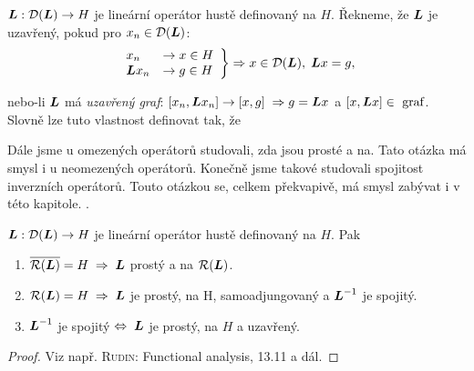 \begin{definition}
$\boldsymbol{L} : \mathcal{D}(\boldsymbol{L}) \to H$ je lineární operátor hustě definovaný na $H$.  Řekneme, že $\boldsymbol{L}$ je uzavřený, pokud pro $x_n\in\mathcal{D}(\boldsymbol{L})$:
 \begin{equation*}
    \begin{split}
        \left.
    \begin{array}{ll}
        x_n&\rightarrow x\in H\\
        \boldsymbol{L}x_n&\rightarrow g \in H
    \end{array}
        \right \} \Rightarrow x\in \mathcal{D}(\boldsymbol{L}),\; \boldsymbol{L}x=g,
    \end{split}
\end{equation*}
\end{definition}
nebo-li $\boldsymbol{L}$ má \emph{uzavřený graf}: $[x_n,\boldsymbol{L}x_n]\rightarrow [x,g]\;\Rightarrow g=\boldsymbol{L} x$ a $[x,\boldsymbol{L}x]\in \text{ graf}$. Slovně lze tuto vlastnost definovat tak, že 

Dále jsme u omezených operátorů studovali, zda jsou prosté a na. Tato otázka má smysl i u neomezených operátorů. Konečně jsme takové studovali spojitost inverzních operátorů. Touto otázkou se, celkem překvapivě, má smysl zabývat i v této kapitole.  .

\begin{theorem}
$\boldsymbol{L} : \mathcal{D}(\boldsymbol{L}) \to H$ je lineární operátor hustě definovaný na $H$. Pak 
\begin{enumerate}
    \item $\overline{\mathcal{R}(\boldsymbol{L})} = H\;\Rightarrow\; \boldsymbol{L}$ prostý a na $\mathcal{R} (\boldsymbol{L})$.
    \item $\mathcal{R}(\boldsymbol{L}) = H\;\Rightarrow\; \boldsymbol{L}$ je prostý, na H, samoadjungovaný a $\boldsymbol{L}^{-1}$ je spojitý.
    \item $\boldsymbol{L}^{-1}$ je spojitý $\Leftrightarrow\;\boldsymbol{L}$ je prostý, na $H$ a uzavřený.
\end{enumerate} 
\end{theorem}
\begin{proof}
Viz např.  \textsc{Rudin}: Functional analysis, 13.11 a dál.
\end{proof}

